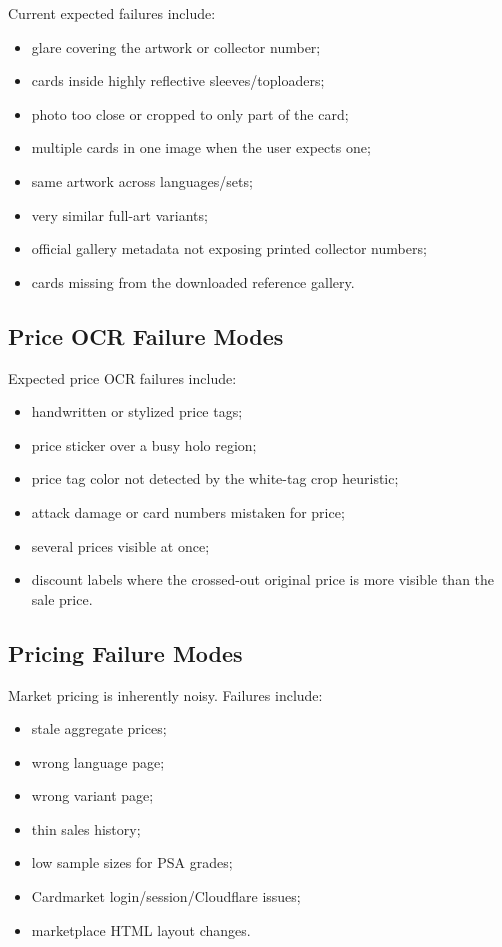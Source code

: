 \documentclass[11pt,a4paper]{article}
\begin{document}
Current expected failures include:

\begin{itemize}
  \item glare covering the artwork or collector number;
  \item cards inside highly reflective sleeves/toploaders;
  \item photo too close or cropped to only part of the card;
  \item multiple cards in one image when the user expects one;
  \item same artwork across languages/sets;
  \item very similar full-art variants;
  \item official gallery metadata not exposing printed collector numbers;
  \item cards missing from the downloaded reference gallery.
\end{itemize}

\subsection{Price OCR Failure Modes}

Expected price OCR failures include:

\begin{itemize}
  \item handwritten or stylized price tags;
  \item price sticker over a busy holo region;
  \item price tag color not detected by the white-tag crop heuristic;
  \item attack damage or card numbers mistaken for price;
  \item several prices visible at once;
  \item discount labels where the crossed-out original price is more visible than the sale price.
\end{itemize}

\subsection{Pricing Failure Modes}

Market pricing is inherently noisy. Failures include:

\begin{itemize}
  \item stale aggregate prices;
  \item wrong language page;
  \item wrong variant page;
  \item thin sales history;
  \item low sample sizes for PSA grades;
  \item Cardmarket login/session/Cloudflare issues;
  \item marketplace HTML layout changes.
\end{itemize}
\end{document}
